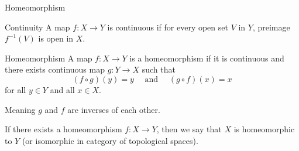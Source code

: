 \documentclass[10pt,aspectratio=169]{beamer}
\begin{document}
    \begin{frame}{Homeomorphism}

        \begin{block}{Continuity}
            A map $f: X\to Y$ is continuous if for every open set $V$ in $Y$, preimage $f^{-1}(V)$ is open in $X$.
        \end{block}

        \begin{block}{Homeomorphism}
            A map $f: X\to Y$ is a homeomorphism if it is continuous and there exists continuous map $g: Y\to X$ such that
            \[(f\circ g) (y) = y \quad \text{ and } \quad (g\circ f)(x)=x\]
            for all $y\in Y$ and all $x\in X$.

            Meaning $g$ and $f$ are inverses of each other.

            If there exists a homeomorphism $f: X\to Y$, then we say that $X$ is homeomorphic to $Y$ (or isomorphic in category of topological spaces).
        \end{block}

    \end{frame}
\end{document}
